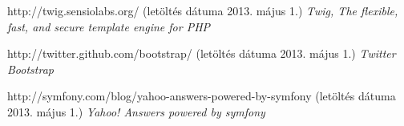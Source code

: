 \documentclass[a4paper,12pt,oneside]{report}
\begin{document}
\begin{thebibliography}{99}
        http://twig.sensiolabs.org/
        (letöltés dátuma 2013. május 1.)
        {\em Twig, The flexible, fast, and secure template engine for PHP}

        http://twitter.github.com/bootstrap/
        (letöltés dátuma 2013. május 1.)
        {\em Twitter Bootstrap}

        http://symfony.com/blog/yahoo-answers-powered-by-symfony
        (letöltés dátuma 2013. május 1.)
        {\em Yahoo! Answers powered by symfony}

\end{thebibliography}
\end{document}
